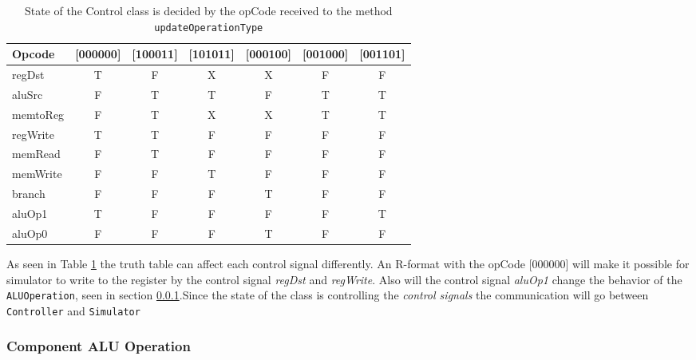 \begin{table}[H]
\centering
\begin{tabular}{l|cccccc}
\hline
\bf{Opcode}    &\bf{[000000]}&\bf{[100011]} &\bf{[101011]}  &\bf{[000100]}  &\bf{[001000]}  &\bf{[001101]} \\\hline
   regDst      &   T         &   F          &   X           &   X           &   F           &   F    \\\hline
   aluSrc      &   F         &   T          &   T           &   F           &   T           &   T    \\\hline
   memtoReg    &   F         &   T          &   X           &   X           &   T           &   T    \\\hline
   regWrite    &   T         &   T          &   F           &   F           &   F           &   F    \\\hline
   memRead     &   F         &   T          &   F           &   F           &   F           &   F    \\\hline
   memWrite    &   F         &   F          &   T           &   F           &   F           &   F    \\\hline
   branch      &   F         &   F          &   F           &   T           &   F           &   F    \\\hline
   aluOp1      &   T         &   F          &   F           &   F           &   F           &   T    \\\hline
   aluOp0      &   F         &   F          &   F           &   T           &   F           &   F    \\\hline
\end{tabular}
\caption{State of the Control class is decided by the opCode received to the method \texttt{updateOperationType}}
\label{table:AluControlState}
\end{table}

As seen in Table \ref{table:AluControlState} the truth table can
affect each control signal differently. An R-format with the opCode
[000000] will make it possible for simulator to write to the register
by the control signal \emph{regDst} and \emph{regWrite}. Also will the
control signal \emph{aluOp1} change the behavior of the
\texttt{ALUOperation}, seen in section \ref{sec:ALuOperation}.Since
the state of the class is controlling the \emph{control signals} the
communication will go between \texttt{Controller} and
\texttt{Simulator}

\subsubsection{Component ALU Operation}
\label{sec:ALuOperation}

